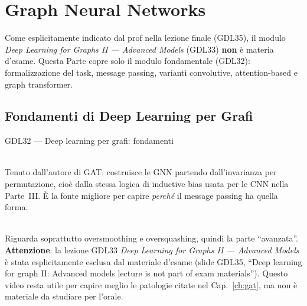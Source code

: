 \part{Graph Neural Networks}
\label{part:gnn}

\begin{remark}
Come esplicitamente indicato dal prof nella lezione finale (GDL35), il modulo \emph{Deep Learning for Graphs II — Advanced Models} (GDL33) \textbf{non} è materia d'esame. Questa Parte copre solo il modulo fondamentale (GDL32): formalizzazione del task, message passing, varianti convolutive, attention-based e graph transformer.
\end{remark}

\chapter{Fondamenti di Deep Learning per Grafi}

\begin{risorsevideo}{GDL32 — Deep learning per grafi: fondamenti}

\medskip
{}\\
Tenuto dall'autore di GAT: costruisce le GNN partendo dall'invarianza per permutazione, cioè dalla stessa logica di inductive bias usata per le CNN nella Parte~III. È la fonte migliore per capire \emph{perché} il message passing ha quella forma.

\medskip
{}\\
Riguarda soprattutto oversmoothing e oversquashing, quindi la parte ``avanzata''. \textbf{Attenzione}: la lezione GDL33 \emph{Deep Learning for Graphs II — Advanced Models} è stata esplicitamente esclusa dal materiale d'esame (slide GDL35, ``Deep learning for graph II: Advanced models lecture is not part of exam materials''). Questo video resta utile per capire meglio le patologie citate nel Cap.~\ref{ch:gat}, ma non è materiale da studiare per l'orale.
\end{risorsevideo}
\label{ch:gnn-fund}

